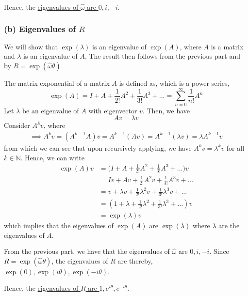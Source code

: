 Hence, the \underline{eigenvalues of \( \hat{\omega} \) are \( 0, i, -i \)}.

\subsubsection*{(b) Eigenvalues of \( R \)}

We will show that \( \exp(\lambda) \) is an eigenvalue of \( \exp(A) \), where \( A \) is a matrix and \( \lambda \) is an eigenvalue of \( A \).
The result then follows from the previous part and by \( R = \exp(\hat{\omega} \theta) \).

The matrix exponential of a matrix \( A \) is defined as, which is a power series,
\[
    \exp(A)
    = I + A + \frac{1}{2!} A^{2} + \frac{1}{3!} A^{3} + \ldots
    = \sum_{n=0}^{\infty} \frac{1}{n!} A^{n}
\]
Let \( \lambda \) be an eigenvalue of \( A \) with eigenvector \( v \).
Then, we have
\[
    A v = \lambda v
\]
Consider \( A^k v \), where
\begin{align*}
    \implies
    A^k v
    =
    (A^{k-1} A) v
    =
    A^{k-1}(A v) = A^{k-1} (\lambda v)
    =
    \lambda A^{k-1} v
\end{align*}
from which we can see that upon recursively applying, we have \( A^k v = \lambda^k v \) for all \( k \in \mathbb{N} \).
Hence, we can write
\begin{align*}
    \exp(A) v
     & = \Big(I + A + \frac{1}{2!} A^{2} + \frac{1}{3!} A^{3} + \ldots\Big) v
    \\ & =
    I v + A v + \frac{1}{2!} A^{2} v + \frac{1}{3!} A^{3} v + \ldots
    \\ & =
    v + \lambda v + \frac{1}{2!} \lambda^{2} v + \frac{1}{3!} \lambda^{3} v + \ldots
    \\ & =
    (1 + \lambda + \frac{1}{2!} \lambda^{2} + \frac{1}{3!} \lambda^{3} + \ldots) v
    \\ & =
    \exp(\lambda) v
\end{align*}
which implies that the eigenvalues of \( \exp(A) \) are \( \exp(\lambda) \) where \( \lambda \) are the eigenvalues of \( A \).

From the previous part, we have that the eigenvalues of \( \hat{\omega} \) are \( 0, i, -i \).
Since \( R = \exp(\hat{\omega} \theta) \), the eigenvalues of \( R \) are thereby, \( \exp(0), \exp(i \theta), \exp(-i \theta) \).

Hence, the \underline{eigenvalues of \( R \) are \( 1, e^{i \theta}, e^{-i \theta} \)}.
